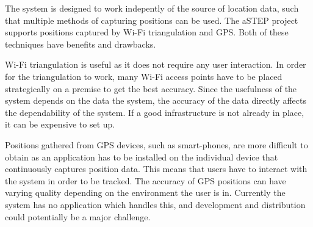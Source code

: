 The system is designed to work indepently of the source of location data, such that multiple methods of capturing positions can be used. The aSTEP project supports positions captured by Wi-Fi triangulation and GPS. Both of these techniques have benefits and drawbacks.

Wi-Fi triangulation is useful as it does not require any user interaction. In order for the triangulation to work, many Wi-Fi access points have to be placed strategically on a premise to get the best accuracy. Since the usefulness of the system depends on the data the system, the accuracy of the data directly affects the dependability of the system. If a good infrastructure is not already in place, it can be expensive to set up.

Positions gathered from GPS devices, such as smart-phones, are more difficult to obtain as an application has to be installed on the individual device that continuously captures position data. This means that users have to interact with the system in order to be tracked. The accuracy of GPS positions can have varying quality depending on the environment the user is in. Currently the system has no application which handles this, and development and distribution could potentially be a major challenge.

